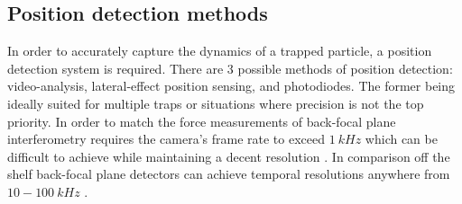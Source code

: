 \subsection{Position detection methods}
In order to accurately capture the dynamics of a trapped particle, a 
position detection system is required. There are 3 possible methods 
of position detection: video-analysis, lateral-effect position sensing, 
and photodiodes. The former being ideally suited for multiple traps 
or situations where precision is not the top priority. In order to 
match the force measurements of back-focal plane interferometry requires 
the camera's frame rate to exceed $1\ kHz$ which can be difficult 
to achieve while maintaining a decent resolution \cite{Gibson2008}. 
In comparison off the shelf back-focal plane detectors can achieve 
temporal resolutions anywhere from $10-100\ kHz$ \cite{BergSoerensen2004}. 
 
